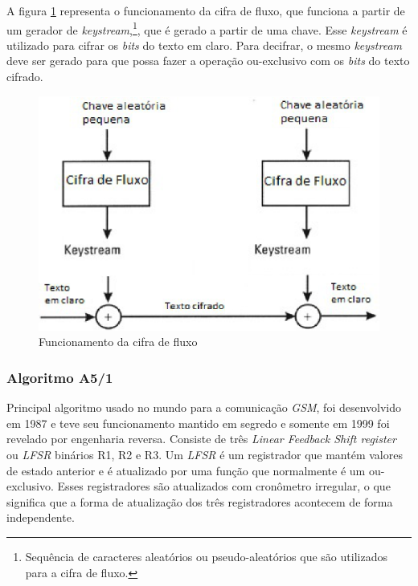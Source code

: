 A figura \ref{stream-cipher-functioning} representa o  funcionamento da cifra de fluxo, que funciona a partir de um gerador de \textit{keystream},\footnote{Sequência de caracteres aleatórios ou pseudo-aleatórios que são utilizados para a cifra de fluxo.}, que é gerado a partir de uma chave. Esse \textit{keystream} é utilizado para cifrar os \textit{bits}  do texto em claro. Para decifrar, o mesmo \textit{keystream} deve ser gerado para que possa fazer a operação ou-exclusivo com os \textit{bits} do texto cifrado.

\begin{figure}[h]
\centering
\includegraphics[keepaspectratio=true,scale=0.9]
    {figuras/stream_cipher.eps}
    \caption[Funcionamento da cifra de fluxo]{Funcionamento da cifra de fluxo\protect\footnotemark} 
    \label{stream-cipher-functioning}
\end{figure}

\subsubsection{Algoritmo A5/1}
\label{algorithm-a51}

Principal algoritmo usado no mundo para a comunicação \textit{GSM}, foi desenvolvido em 1987 e teve seu funcionamento mantido em segredo e somente em 1999 foi revelado por engenharia reversa. Consiste de três \textit{Linear Feedback Shift register} ou \textit{LFSR} binários R1, R2 e R3. Um \textit{LFSR} é um registrador que mantém valores de estado anterior e é atualizado por uma função que normalmente é um ou-exclusivo. Esses registradores são atualizados com cronômetro irregular, o que significa que a forma de atualização dos três registradores acontecem de forma independente. 

